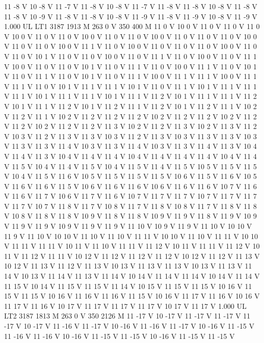 {11 -8 V
10 -8 V
11 -7 V
11 -8 V
10 -8 V
11 -7 V
11 -8 V
11 -8 V
10 -8 V
11 -8 V
11 -8 V
10 -9 V
11 -8 V
11 -8 V
10 -8 V
11 -9 V
11 -8 V
11 -9 V
10 -8 V
11 -9 V
1.000 UL
LT1
3187 1913 M
263 0 V
350 400 M
11 0 V
10 0 V
11 0 V
11 0 V
11 0 V
10 0 V
11 0 V
11 0 V
10 0 V
11 0 V
11 0 V
10 0 V
11 0 V
11 0 V
11 0 V
10 0 V
11 0 V
11 0 V
10 0 V
11 1 V
11 0 V
10 0 V
11 0 V
11 0 V
11 0 V
10 0 V
11 0 V
11 0 V
10 1 V
11 0 V
11 0 V
10 0 V
11 0 V
11 1 V
11 0 V
10 0 V
11 0 V
11 1 V
10 0 V
11 0 V
11 0 V
10 1 V
11 0 V
11 1 V
11 0 V
10 0 V
11 1 V
11 0 V
10 1 V
11 0 V
11 1 V
11 0 V
10 1 V
11 0 V
11 1 V
10 0 V
11 1 V
11 1 V
10 0 V
11 1 V
11 1 V
11 0 V
10 1 V
11 1 V
11 1 V
10 1 V
11 0 V
11 1 V
10 1 V
11 1 V
11 1 V
11 1 V
10 1 V
11 1 V
11 1 V
10 1 V
11 1 V
11 2 V
10 1 V
11 1 V
11 1 V
11 2 V
10 1 V
11 1 V
11 2 V
10 1 V
11 2 V
11 1 V
11 2 V
10 1 V
11 2 V
11 1 V
10 2 V
11 2 V
11 1 V
10 2 V
11 2 V
11 2 V
11 2 V
10 2 V
11 2 V
11 2 V
10 2 V
11 2 V
11 2 V
10 2 V
11 2 V
11 2 V
11 3 V
10 2 V
11 2 V
11 3 V
10 2 V
11 3 V
11 2 V
10 3 V
11 2 V
11 3 V
11 3 V
10 3 V
11 2 V
11 3 V
10 3 V
11 3 V
11 3 V
10 3 V
11 3 V
11 3 V
11 4 V
10 3 V
11 3 V
11 4 V
10 3 V
11 3 V
11 4 V
11 3 V
10 4 V
11 4 V
11 3 V
10 4 V
11 4 V
11 4 V
10 4 V
11 4 V
11 4 V
11 4 V
10 4 V
11 4 V
11 5 V
10 4 V
11 4 V
11 5 V
10 4 V
11 5 V
11 4 V
11 5 V
10 5 V
11 5 V
11 5 V
10 4 V
11 5 V
11 6 V
10 5 V
11 5 V
11 5 V
11 5 V
10 6 V
11 5 V
11 6 V
10 5 V
11 6 V
11 6 V
11 5 V
10 6 V
11 6 V
11 6 V
10 6 V
11 6 V
11 6 V
10 7 V
11 6 V
11 6 V
11 7 V
10 6 V
11 7 V
11 6 V
10 7 V
11 7 V
11 7 V
10 7 V
11 7 V
11 7 V
11 7 V
10 7 V
11 8 V
11 7 V
10 8 V
11 7 V
11 8 V
10 8 V
11 7 V
11 8 V
11 8 V
10 8 V
11 8 V
11 8 V
10 9 V
11 8 V
11 8 V
10 9 V
11 9 V
11 8 V
11 9 V
10 9 V
11 9 V
11 9 V
10 9 V
11 9 V
11 9 V
11 10 V
10 9 V
11 9 V
11 10 V
10 10 V
11 9 V
11 10 V
10 10 V
11 10 V
11 10 V
11 11 V
10 10 V
11 10 V
11 11 V
10 10 V
11 11 V
11 11 V
10 11 V
11 10 V
11 11 V
11 12 V
10 11 V
11 11 V
11 12 V
10 11 V
11 12 V
11 11 V
10 12 V
11 12 V
11 12 V
11 12 V
10 12 V
11 12 V
11 13 V
10 12 V
11 13 V
11 12 V
11 13 V
10 13 V
11 13 V
11 13 V
10 13 V
11 13 V
11 14 V
10 13 V
11 14 V
11 13 V
11 14 V
10 14 V
11 14 V
11 14 V
10 14 V
11 14 V
11 15 V
10 14 V
11 15 V
11 15 V
11 14 V
10 15 V
11 15 V
11 15 V
10 16 V
11 15 V
11 15 V
10 16 V
11 16 V
11 16 V
11 15 V
10 16 V
11 17 V
11 16 V
10 16 V
11 17 V
11 16 V
10 17 V
11 17 V
11 17 V
11 17 V
10 17 V
11 17 V
1.000 UL
LT2
3187 1813 M
263 0 V
350 2126 M
11 -17 V
10 -17 V
11 -17 V
11 -17 V
11 -17 V
10 -17 V
11 -16 V
11 -17 V
10 -16 V
11 -16 V
11 -17 V
10 -16 V
11 -15 V
11 -16 V
11 -16 V
10 -16 V
11 -15 V
11 -15 V
10 -16 V
11 -15 V
11 -15 V
}
